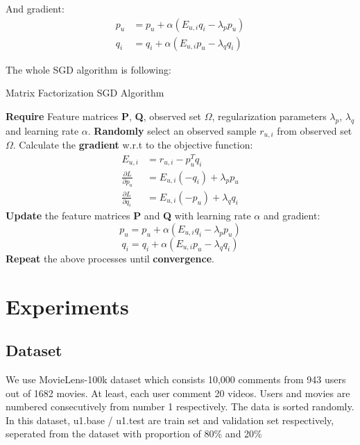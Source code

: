 \documentclass[journal, a4paper]{IEEEtran}
\begin{document}
    And gradient:
    \begin{equation}
        \begin{aligned}
            p_u&=p_u+\alpha(E_{u,i}q_i-\lambda_pp_u) \\
            q_i&=q_i+\alpha(E_{u,i}p_u-\lambda_qq_i)
        \end{aligned}
    \end{equation}

    The whole SGD algorithm is following:
    \begin{algorithm}[H]
        \caption{Matrix Factorization SGD Algorithm}
        \begin{algorithmic}[1]

            \STATE \textbf{Require} Feature matrices \textbf{P}, \textbf{Q},  observed set $\Omega$, regularization parameters $\lambda_p$, $\lambda_q$ and learning rate $\alpha$.
            \STATE \textbf{Randomly} select an observed sample $r_{u,i}$ from observed set $\Omega$.
            \STATE Calculate the \textbf{gradient} w.r.t to the objective function: 
            $$
            \begin{aligned}
                E_{u,i}&=r_{u,i}-p_u^Tq_i \\
                \frac {\partial L}{\partial p_u}&=E_{u,i}(-q_i)+\lambda_pp_u \\
                \frac {\partial L}{\partial q_i}&=E_{u,i}(-p_u)+\lambda_qq_i
            \end{aligned}
            $$
            \STATE \textbf{Update} the feature matrices \textbf{P} and \textbf{Q} with learning rate $\alpha$ and gradient:
            $$p_u=p_u+\alpha(E_{u,i}q_i-\lambda_pp_u)$$
            $$q_i=q_i+\alpha(E_{u,i}p_u-\lambda_qq_i)$$
            \STATE \textbf{Repeat} the above processes until \textbf{convergence}.
        \end{algorithmic} 
    \end{algorithm}

\section{Experiments}
\subsection{Dataset}
    We use MovieLens-100k dataset which consists 10,000 comments from 943 users out of 1682 movies. At least, each user comment 20 videos. Users and movies are numbered consecutively from number 1 respectively. The data is sorted randomly.
    In this dataset, u1.base / u1.test are train set and validation set respectively, seperated from the dataset with proportion of 80\% and 20\%
\end{document}
